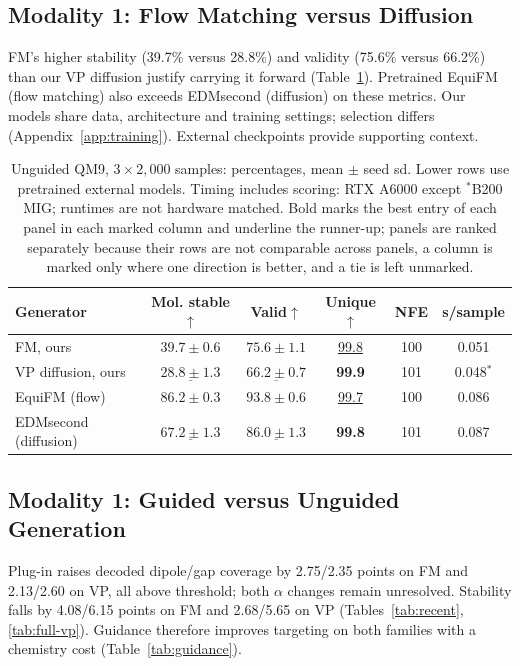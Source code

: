 \documentclass{article}
\begin{document}
\subsection{Modality 1: Flow Matching versus Diffusion}\label{sec:fmvd}
FM's higher stability (39.7\% versus 28.8\%) and validity (75.6\% versus 66.2\%) than our VP diffusion justify carrying it forward (Table~\ref{tab:fmvd}). Pretrained EquiFM (flow matching) also exceeds EDMsecond (diffusion) on these metrics. Our models share data, architecture and training settings; selection differs (Appendix~\ref{app:training}). External checkpoints provide supporting context.
\begin{table}[!htbp]
\centering\small
\caption{Unguided QM9, $3\times2{,}000$ samples: percentages, mean $\pm$ seed sd. Lower rows use pretrained external models. Timing includes scoring: RTX A6000 except $^*$B200 MIG; runtimes are not hardware matched. Bold marks the best entry of each panel in each marked column and underline the runner-up; panels are ranked separately because their rows are not comparable across panels, a column is marked only where one direction is better, and a tie is left unmarked.}
\label{tab:fmvd}
\begin{tabular}{lccccc}
\toprule
Generator & Mol. stable$\uparrow$ & Valid$\uparrow$ & Unique$\uparrow$ & NFE & s/sample\\
\midrule
FM, ours & $\mathbf{39.7\pm0.6}$& $\mathbf{75.6\pm1.1}$& \underline{99.8}& 100 & 0.051\\
VP diffusion, ours & $\underline{28.8\pm1.3}$& $\underline{66.2\pm0.7}$& \textbf{99.9}& 101 & 0.048$^{*}$\\
\midrule
EquiFM (flow) & $\mathbf{86.2\pm0.3}$& $\mathbf{93.8\pm0.6}$& \underline{99.7}& 100 & 0.086\\
EDMsecond (diffusion) & $\underline{67.2\pm1.3}$& $\underline{86.0\pm1.3}$& \textbf{99.8}& 101 & 0.087\\
\bottomrule
\end{tabular}
\end{table}

\subsection{Modality 1: Guided versus Unguided Generation}\label{sec:guidworks}
Plug-in raises decoded dipole/gap coverage by 2.75/2.35 points on FM and 2.13/2.60 on VP, all above threshold; both $\alpha$ changes remain unresolved. Stability falls by 4.08/6.15 points on FM and 2.68/5.65 on VP (Tables~\ref{tab:recent}, \ref{tab:full-vp}). Guidance therefore improves targeting on both families with a chemistry cost (Table~\ref{tab:guidance}).
\end{document}
